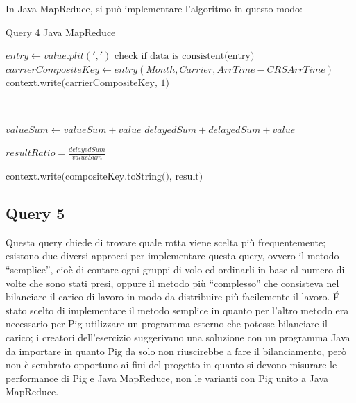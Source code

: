 \documentclass[11pt]{article} %
\begin{document}
In Java MapReduce, si può implementare l'algoritmo in questo modo:

\newpage

\begin{algorithm}
\caption{Query 4 Java MapReduce}\label{euclid}
\begin{algorithmic}[0]


\State $entry \gets value.plit(',')$
\State $\text{check\_if\_data\_is\_consistent(entry)}$
\State $carrierCompositeKey \gets entry(Month, Carrier, ArrTime - CRSArrTime)$
\State $\text{context.write(carrierCompositeKey, 1)}$

\EndProcedure

~


	\State $valueSum \gets valueSum + value$
		\State $delayedSum + delayedSum + value$
	\EndIf
\EndFor

\State $resultRatio = \frac{delayedSum}{valueSum}$

\State $\text{context.write(compositeKey.toString(), result)}$

\EndProcedure


\end{algorithmic}
\end{algorithm}


\subsection{Query 5}

Questa query chiede di trovare quale rotta viene scelta più frequentemente; esistono due diversi approcci per implementare questa query, ovvero il metodo ``semplice'', cioè di contare ogni gruppi di volo ed ordinarli in base al numero di volte che sono stati presi, oppure il metodo più ``complesso'' che consisteva nel bilanciare il carico di lavoro in modo da distribuire più facilemente il lavoro. \'E stato scelto di implementare il metodo semplice in quanto per l'altro metodo era necessario per Pig utilizzare un programma esterno che potesse bilanciare il carico; i creatori dell'esercizio suggerivano una soluzione con un programma Java da importare in quanto Pig da solo non riuscirebbe a fare il bilanciamento, però non è sembrato opportuno ai fini del progetto in quanto si devono misurare le performance di Pig e Java MapReduce, non le varianti con Pig unito a Java MapReduce.
\end{document}
